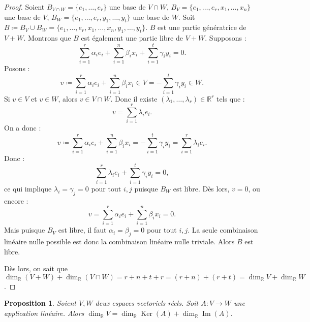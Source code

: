 \documentclass{article}
\DeclareMathOperator{\Ker}{Ker}
\DeclareMathOperator{\Imf}{Im}
\newcommand{\R}{\mathbb R}
\newtheorem{prp}[thm]{Proposition}
\theoremstyle{definition}
\theoremstyle{remark}
\begin{document}
		\begin{proof} Soient $B_{V \cap W} = \{e_1, \ldots, e_r\}$  une base de $V \cap W$, $B_V = \{e_1, \ldots, e_r, x_1, \ldots, x_n\}$ une base de $V$,
		$B_W = \{e_1, \ldots, e_r, y_1, \ldots, y_t\}$ une base de $W$. Soit $B \coloneqq B_V \cup B_W = \{e_1, \ldots, e_r, x_1, \ldots, x_n, y_1, \ldots, y_t\}$.
		$B$ est une partie génératrice de $V+W$. Montrons que $B$ est également une partie libre de $V+W$. Supposons :
		\[\sum_{i=1}^r\alpha_ie_i + \sum_{i=1}^n\beta_ix_i + \sum_{i=1}^t\gamma_iy_i = 0.\] Posons : \[v \coloneqq \sum_{i=1}^r\alpha_ie_i + \sum_{i=1}^n\beta_ix_i \in V
		= - \sum_{i=1}^t\gamma_iy_i \in W.\] Si $v \in V$ et $v \in W$, alors $v \in V \cap W$. Donc il existe $(\lambda_1, \ldots, \lambda_r) \in \R^r$ tels que :
		\[v = \sum_{i=1}^r\lambda_ie_i.\] On a donc : \[v \coloneqq \sum_{i=1}^r\alpha_ie_i + \sum_{i=1}^n\beta_ix_i = -\sum_{i=1}^t\gamma_iy_i = \sum_{i=1}^r\lambda_ie_i.\]
		Donc : \[\sum_{i=1}^r\lambda_ie_i + \sum_{i=1}^t\gamma_iy_i = 0,\] ce qui implique $\lambda_i = \gamma_j = 0$ pour tout $i, j$ puisque $B_W$ est libre. Dès lors,
		$v = 0$, ou encore : \[v = \sum_{i=1}^r\alpha_ie_i + \sum_{i=1}^n\beta_ix_i = 0.\] Mais puisque $B_V$ est libre, il faut $\alpha_i = \beta_j = 0$ pour tout $i, j$.
		La seule combinaison linéaire nulle possible est donc la combinaison linéaire nulle triviale. Alors $B$ est libre.

		Dès lors, on sait que $\dim_\R(V+W) + \dim_\R(V \cap W) = r+n+t + r = (r+n) + (r+t) = \dim_\R V + \dim_\R W$. \end{proof}

		\begin{prp}\label{dim=dim+dim} Soient $V, W$ deux espaces vectoriels réels. Soit $A : V \to W$ une application linéaire.
		Alors $\dim_\R V = \dim_\R \Ker(A) + \dim_\R\Imf(A)$. \end{prp}
\end{document}
